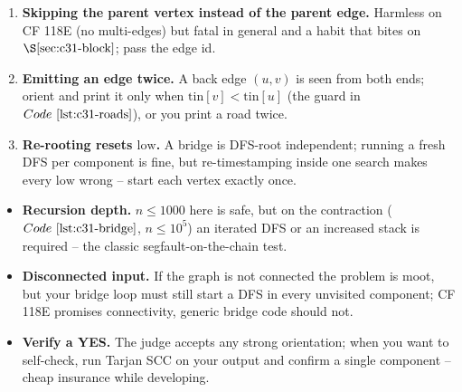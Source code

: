 \begin{warningbox}
\begin{enumerate}[nosep,leftmargin=1.6em]
  \item \textbf{Skipping the parent vertex instead of the parent edge.} Harmless on
        CF 118E (no multi-edges) but fatal in general and a habit that bites on
        \(\secref{c31-block}\); pass the edge id.
  \item \textbf{Emitting an edge twice.} A back edge \((u,v)\) is seen from both ends;
        orient and print it only when \(\mathrm{tin}[v]<\mathrm{tin}[u]\) (the
         guard in \(\coderef{c31-roads}\)), or you print a road twice.
  \item \textbf{Re-rooting resets \(\mathrm{low}\).} A bridge is DFS-root independent;
        running a fresh DFS per component is fine, but re-timestamping inside one search
        makes every \(\mathrm{low}\) wrong -- start each vertex exactly once.
\end{enumerate}
\end{warningbox}

\begin{hardeningbox}
\begin{itemize}[nosep,leftmargin=1.4em]
  \item \textbf{Recursion depth.} \(n\le1000\) here is safe, but on the contraction
        (\(\coderef{c31-bridge}\), \(n\le10^5\)) an iterated DFS or an increased stack is
        required -- the classic segfault-on-the-chain test.
  \item \textbf{Disconnected input.} If the graph is not connected the problem is moot, but
        your bridge loop must still start a DFS in every unvisited component; CF 118E
        promises connectivity, generic bridge code should not.
  \item \textbf{Verify a YES.} The judge accepts any strong orientation; when you want to
        self-check, run Tarjan SCC on your output and confirm a single component -- cheap
        insurance while developing.
\end{itemize}
\end{hardeningbox}

